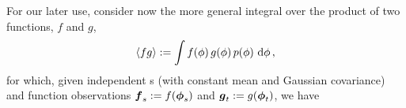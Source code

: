 \documentclass{article}
\begin{document}
For our later use, consider now the more general integral over the product of two functions, $f$ and $g$,
$$\inty{f g} \deq \int f(\phi)\,g(\phi)\,\po{\phi}\,\ud\phi\,,$$ 
for which, given independent \gp s (with constant mean and Gaussian covariance) and function observations $\vf_{s} \deq f(\vph_{s})$ and  $\vg_{t} \deq g(\vph_{t})$, we have
% 
\end{document}
